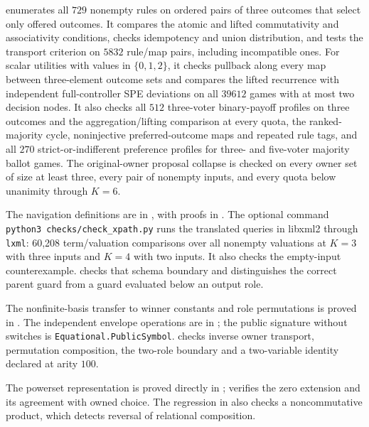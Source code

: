  enumerates all $729$ nonempty rules on
ordered pairs of three outcomes that select only offered outcomes.
It compares the atomic and lifted commutativity and associativity
conditions, checks idempotency and union distribution, and tests the
transport criterion on $5832$ rule/map pairs, including incompatible
ones. For scalar utilities with values in $\{0,1,2\}$, it checks
pullback along every map between three-element outcome sets and
compares the lifted recurrence with independent full-controller SPE
deviations on all $39612$ games with at most two decision nodes.
It also checks all $512$ three-voter binary-payoff profiles on three
outcomes and the aggregation/lifting comparison at every quota, the
ranked-majority cycle, noninjective preferred-outcome maps and repeated
rule tags, and all $270$ strict-or-indifferent preference profiles for
three- and five-voter majority ballot games. The original-owner
proposal collapse is checked on every owner set of size at least three,
every pair of nonempty inputs, and every quota below unanimity through
$K=6$.

The navigation definitions are in , with proofs in . The optional command \texttt{python3 checks/check\_xpath.py} runs the translated queries in libxml2 through \texttt{lxml}: 60,208 term/valuation comparisons over all nonempty valuations at $K=3$ with three inputs and $K=4$ with two inputs. It also checks the empty-input counterexample.  checks that schema boundary and distinguishes the correct parent guard from a guard evaluated below an output role.

The nonfinite-basis transfer to winner constants and role permutations is
proved in . The independent envelope
operations are in ; the public
signature without switches is \texttt{Equational.PublicSymbol}.
 checks inverse owner transport,
permutation composition, the two-role boundary and a two-variable identity
declared at arity $100$.

The powerset representation is proved directly in
;
 verifies the zero extension and its
agreement with owned choice. The regression in
 also checks a noncommutative
product, which detects reversal of relational composition.

